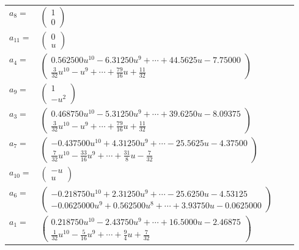 \documentclass[1p]{elsarticle_modified}
\theoremstyle{definition}
\begin{document}
\begin{tabular}{m{7pt} m{180pt} m{7pt} m{180pt} }
\flushright $a_{8}=$&$\begin{pmatrix}1\\0\end{pmatrix}$ \\
\flushright $a_{11}=$&$\begin{pmatrix}0\\u\end{pmatrix}$ \\
\flushright $a_{4}=$&$\begin{pmatrix}0.562500 u^{10}-6.31250 u^{9}+\cdots+44.5625 u-7.75000\\\frac{3}{32} u^{10}- u^9+\cdots+\frac{79}{16} u+\frac{11}{32}\end{pmatrix}$ \\
\flushright $a_{9}=$&$\begin{pmatrix}1\\- u^2\end{pmatrix}$ \\
\flushright $a_{3}=$&$\begin{pmatrix}0.468750 u^{10}-5.31250 u^{9}+\cdots+39.6250 u-8.09375\\\frac{3}{32} u^{10}- u^9+\cdots+\frac{79}{16} u+\frac{11}{32}\end{pmatrix}$ \\
\flushright $a_{7}=$&$\begin{pmatrix}-0.437500 u^{10}+4.31250 u^{9}+\cdots-25.5625 u-4.37500\\\frac{7}{32} u^{10}-\frac{33}{16} u^9+\cdots+\frac{31}{8} u-\frac{7}{32}\end{pmatrix}$ \\
\flushright $a_{10}=$&$\begin{pmatrix}- u\\u\end{pmatrix}$ \\
\flushright $a_{6}=$&$\begin{pmatrix}-0.218750 u^{10}+2.31250 u^{9}+\cdots-25.6250 u-4.53125\\-0.0625000 u^{9}+0.562500 u^{8}+\cdots+3.93750 u-0.0625000\end{pmatrix}$ \\
\flushright $a_{1}=$&$\begin{pmatrix}0.218750 u^{10}-2.43750 u^{9}+\cdots+16.5000 u-2.46875\\\frac{1}{32} u^{10}-\frac{5}{16} u^9+\cdots+\frac{9}{4} u+\frac{7}{32}\end{pmatrix}$ \\

\end{tabular}
\end{document}
